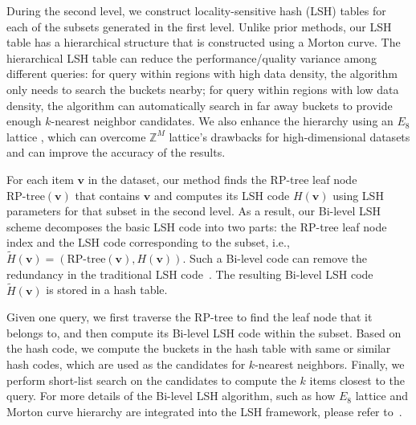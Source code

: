 During the second level, we construct locality-sensitive hash (LSH) tables for each of the subsets generated in the first level. Unlike prior methods, our LSH table has a hierarchical structure that is constructed using a Morton curve. The hierarchical LSH table can reduce the performance/quality variance among different queries: for query within regions with high data density, the algorithm only needs to search the buckets nearby; for query within regions with low data density, the algorithm can automatically search in far away buckets to provide enough $k$-nearest neighbor candidates. We also enhance the hierarchy using an $E_8$ lattice , which can overcome $\mathbb Z^M$ lattice's drawbacks for high-dimensional datasets and can improve the accuracy of the results.

For each item $\mathbf v$ in the dataset, our method finds the RP-tree leaf node $\text{RP-tree}(\mathbf v)$ that contains $\mathbf v$ and computes its LSH code $H(\mathbf v)$ using LSH parameters for that subset in the second level. As a result, our Bi-level LSH scheme decomposes the basic LSH code into two parts: the RP-tree leaf node index and the LSH code corresponding to the subset, i.e., $\tilde{H}(\mathbf v) = (\text{RP-tree}(\mathbf v), H(\mathbf v))$. Such a Bi-level code can remove the redundancy in the traditional LSH code~\cite{BilevelLSH2011}.
The resulting Bi-level LSH code $\tilde{H}(\mathbf v)$ is stored in a hash table.

Given one query, we first traverse the RP-tree to find the leaf node that it belongs to, and then compute its Bi-level LSH code within the subset. Based on the hash code, we compute the buckets in the hash table with same or similar hash codes, which are used as the candidates for $k$-nearest neighbors. Finally, we perform short-list search on the candidates to compute the $k$ items closest to the query. For more details of the Bi-level LSH algorithm, such as how $E_8$ lattice and Morton curve hierarchy are integrated into the LSH framework, please refer to~\cite{BilevelLSH2011}.

